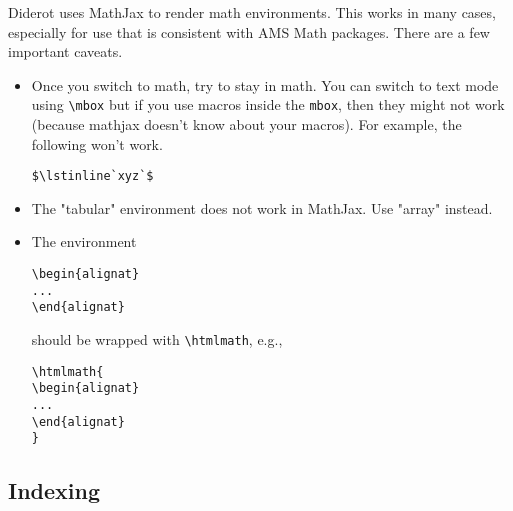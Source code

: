 Diderot uses MathJax to render math environments.  This works in many cases, especially for use that is consistent with AMS Math packages.  There are a few important caveats. 
%
\begin{itemize}
\item Once you switch to math, try to stay in math.  You can switch to text mode using \lstinline`\mbox` but if you use macros inside  the \lstinline`mbox`, then they might not work (because mathjax doesn't know about your macros).  For example, the following won't work. 
\begin{lstlisting}
$\lstinline`xyz`$
\end{lstlisting}

\item The "tabular" environment does not work in MathJax.  Use "array" instead.

\item  The environment 
\begin{lstlisting}
\begin{alignat} 
... 
\end{alignat}
\end{lstlisting}
%
should be wrapped with \lstinline`\htmlmath`, e.g.,
%
\begin{lstlisting}
\htmlmath{
\begin{alignat} 
... 
\end{alignat}
}
\end{lstlisting} 
\end{itemize}


\subsection{Indexing}

